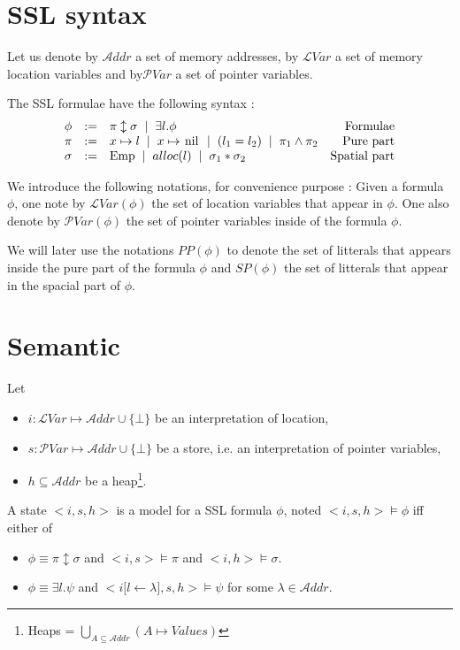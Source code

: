 \documentclass[a4paper,twoside,12pt]{report}
\newcommand\Addr{\mathcal{A}ddr} %
\newcommand\LVar{\mathcal{L}Var} %
\newcommand\PVar{\mathcal{P}Var} %
\newcommand{\Pp}[1]{PP(#1)} %
\newcommand{\Sp}[1]{SP(#1)} %
\newcommand{\Alloc}[1]{alloc(#1)}
\newcommand{\Emp}{\lstinline{Emp}}
\newcommand{\Unsep}[0]{\ast}
\newcommand{\Sep}[2]{#1 \Unsep #2}
\newcommand{\EqLoc}[2]{ (#1 = #2) }
\newcommand{\Andpure}[2]{ #1 \wedge #2}
\newcommand{\Pointsto}[2]{ #1 \mapsto #2}
\newcommand{\nil}[0]{\lstinline!nil!}
\newcommand{\Pointstonil}[1]{ #1 \mapsto \mbox{\nil}}
\newcommand{\Formula}[2]{ #1  \updownarrow #2}
\newcommand{\Exists}[2]{ \exists #1. #2}
\newcommand{\Substin}[3]{#1\lbrack #2 \gets #3 \rbrack}
\begin{document}
\section{SSL syntax}
\label{sec:SSLsyntac}
Let us denote by $\Addr$ a set of memory addresses, by $\LVar$ a set of memory location variables and  by$\PVar$ a set of pointer variables.

The SSL formulae have the following syntax :
$$
\begin{array}{lclr}
\phi & := & \Formula{\pi}{\sigma} \gspace | \gspace \Exists{l}{\phi} & \mbox{Formulae} \\
\pi & := & \Pointsto{x}{l} \gspace | \gspace \Pointstonil{x} \gspace | \gspace \EqLoc{l_1}{l_2} \gspace | \gspace \Andpure{\pi_1}{\pi_2} & {\mbox{Pure part}} \\
\sigma &:=& \Emp  \gspace | \gspace \Alloc{l} \gspace | \gspace \Sep{\sigma_1}{\sigma_2} & \mbox{Spatial part}
\end{array}
$$

We introduce the following notations, for convenience purpose :
Given a formula $\phi$, one note by $\LVar(\phi)$ the set of location
variables that appear in $\phi$. One also denote by $\PVar(\phi)$ the
set of pointer variables inside of the formula $\phi$.

We will later use the notations $\Pp{\phi}$ to denote the set of litterals
that appears inside the pure part of the formula $\phi$ and $\Sp{\phi}$ the
set of litterals that appear in the spacial part of $\phi$.

\section{Semantic}

Let  
\begin{itemize}
\item $i : \LVar \mapsto \Addr \cup \lbrace \bot \rbrace $ be an interpretation of location,
\item $s : \PVar \mapsto \Addr \cup \lbrace \bot \rbrace$ be a store, i.e. an interpretation of pointer
variables,
\item $h\subseteq \Addr$ be a heap\footnote{Heaps = $\bigcup_{A\subseteq \Addr}(A \mapsto Values)$}.
\end{itemize}  


A state $<i,s,h>$ is a model for a SSL formula $\phi$, noted $<i,s,h> \models \phi$ iff either of 
\begin{itemize}
\item $\phi \equiv \Formula {\pi}{\sigma}$ and $<i,s> \models \pi $ and $< i , h>\models \sigma$.
\item $\phi \equiv \Exists{l}{\psi}$ and $< \Substin{i}{l}{\lambda},s,h>\models \psi$ for some $\lambda \in \Addr$. 
\end{itemize}
\end{document}

